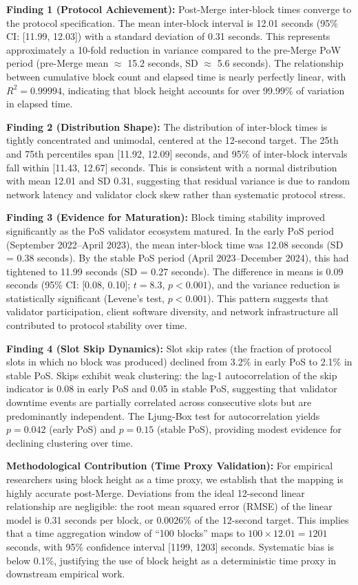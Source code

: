 \documentclass[12pt]{article}
\begin{document}
\textbf{Finding 1 (Protocol Achievement):} Post-Merge inter-block times converge to the protocol specification. The mean inter-block interval is 12.01 seconds (95\% CI: [11.99, 12.03]) with a standard deviation of 0.31 seconds. This represents approximately a 10-fold reduction in variance compared to the pre-Merge PoW period (pre-Merge mean $\approx$ 15.2 seconds, SD $\approx$ 5.6 seconds). The relationship between cumulative block count and elapsed time is nearly perfectly linear, with $R^2 = 0.99994$, indicating that block height accounts for over 99.99\% of variation in elapsed time.

\textbf{Finding 2 (Distribution Shape):} The distribution of inter-block times is tightly concentrated and unimodal, centered at the 12-second target. The 25th and 75th percentiles span [11.92, 12.09] seconds, and 95\% of inter-block intervals fall within [11.43, 12.67] seconds. This is consistent with a normal distribution with mean 12.01 and SD 0.31, suggesting that residual variance is due to random network latency and validator clock skew rather than systematic protocol stress.

\textbf{Finding 3 (Evidence for Maturation):} Block timing stability improved significantly as the PoS validator ecosystem matured. In the early PoS period (September 2022–April 2023), the mean inter-block time was 12.08 seconds (SD = 0.38 seconds). By the stable PoS period (April 2023–December 2024), this had tightened to 11.99 seconds (SD = 0.27 seconds). The difference in means is 0.09 seconds (95\% CI: [0.08, 0.10]; $t = 8.3$, $p < 0.001$), and the variance reduction is statistically significant (Levene's test, $p < 0.001$). This pattern suggests that validator participation, client software diversity, and network infrastructure all contributed to protocol stability over time.

\textbf{Finding 4 (Slot Skip Dynamics):} Slot skip rates (the fraction of protocol slots in which no block was produced) declined from 3.2\% in early PoS to 2.1\% in stable PoS. Skips exhibit weak clustering: the lag-1 autocorrelation of the skip indicator is 0.08 in early PoS and 0.05 in stable PoS, suggesting that validator downtime events are partially correlated across consecutive slots but are predominantly independent. The Ljung-Box test for autocorrelation yields $p = 0.042$ (early PoS) and $p = 0.15$ (stable PoS), providing modest evidence for declining clustering over time.

\textbf{Methodological Contribution (Time Proxy Validation):} For empirical researchers using block height as a time proxy, we establish that the mapping is highly accurate post-Merge. Deviations from the ideal 12-second linear relationship are negligible: the root mean squared error (RMSE) of the linear model is 0.31 seconds per block, or 0.0026\% of the 12-second target. This implies that a time aggregation window of ``100 blocks'' maps to $100 \times 12.01 = 1201$ seconds, with 95\% confidence interval [1199, 1203] seconds. Systematic bias is below 0.1\%, justifying the use of block height as a deterministic time proxy in downstream empirical work.
\end{document}
